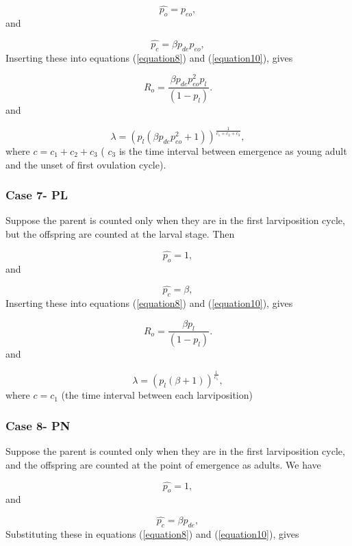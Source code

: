 \documentclass[10pt,a4paper]{article}
\begin{document}
$$\hat{p_o}= p_{eo},$$ and 

$$\hat{p_c}= \beta p_{de}p_{eo},$$
Inserting these into  equations (\ref{equation8}) and (\ref{equation10}), gives

\begin{equation}
\label{equation885} 
R_o =\frac{\beta p_{de}p^2_{eo}p_l}{(1-p_l)}.
\end{equation} and

\begin{equation}
\label{equation105} 
\lambda =(p_l(\beta p_{de}p^2_{eo}+1))^\frac{1}{c_1 + c_2 + c_3},
\end{equation} 
where $c = c_1 + c_2 + c_3$ ( $c_3$ is the time interval between emergence as young adult and the unset of first ovulation cycle). 
 
 
 
 
 
 \subsubsection*{Case 7- PL}
 
 Suppose the parent is counted only when they are in the first larviposition cycle, but the offspring are counted at the larval stage. Then
 
 $$\hat{p_o}= 1,$$ and 
 
 $$\hat{p_c}= \beta,$$
 Inserting these into  equations (\ref{equation8}) and (\ref{equation10}), gives
 
 \begin{equation}
 \label{equation886} 
 R_o =\frac{\beta p_l}{(1-p_l)}.
 \end{equation} and
 
 \begin{equation}
 \label{equation106} 
 \lambda =(p_l(\beta + 1))^\frac{1}{c_1},
 \end{equation}
 where $c = c_1$ (the time interval between each larviposition) 
 
 
 
 
 \subsubsection*{Case 8- PN}
 
 Suppose the parent is counted only when they are in the first larviposition cycle, and the offspring are counted at the point of emergence as  adults. We have
 
 $$\hat{p_o}= 1,$$ and 
 
 $$\hat{p_c}= \beta p_{de},$$
 Substituting these in  equations (\ref{equation8}) and (\ref{equation10}), gives
 
\end{document}
